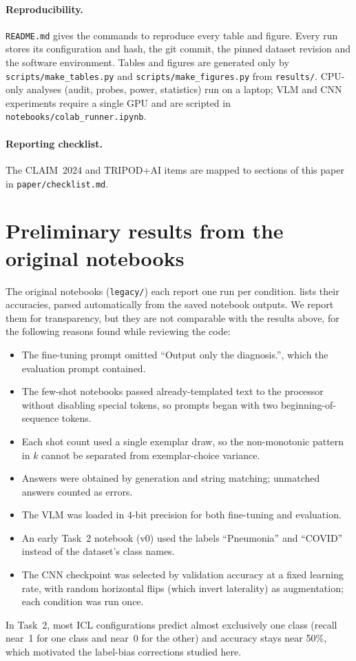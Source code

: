 \documentclass[11pt]{article}
\begin{document}
\paragraph{Reproducibility.} \texttt{README.md} gives the commands to reproduce every table and
figure. Every run stores its configuration and hash, the git commit, the pinned dataset
revision and the software environment. Tables and figures are generated only by
\texttt{scripts/make\_tables.py} and \texttt{scripts/make\_figures.py} from \texttt{results/}.
CPU-only analyses (audit, probes, power, statistics) run on a laptop; VLM and CNN experiments
require a single GPU and are scripted in \texttt{notebooks/colab\_runner.ipynb}.

\paragraph{Reporting checklist.} The CLAIM~2024 and TRIPOD+AI items are mapped to sections of
this paper in \texttt{paper/checklist.md}.




\appendix

\section{Preliminary results from the original notebooks}\label{sec:legacy}

The original notebooks (\texttt{legacy/}) each report one run per condition. 
lists their accuracies, parsed automatically from the saved notebook outputs. We report them for
transparency, but they are not comparable with the results above, for the following reasons
found while reviewing the code:
\begin{itemize}
  \item The fine-tuning prompt omitted ``Output only the diagnosis.'', which the evaluation
  prompt contained.
  \item The few-shot notebooks passed already-templated text to the processor without disabling
  special tokens, so prompts began with two beginning-of-sequence tokens.
  \item Each shot count used a single exemplar draw, so the non-monotonic pattern in $k$ cannot
  be separated from exemplar-choice variance.
  \item Answers were obtained by generation and string matching; unmatched answers counted as
  errors.
  \item The VLM was loaded in 4-bit precision for both fine-tuning and evaluation.
  \item An early Task~2 notebook (v0) used the labels ``Pneumonia'' and ``COVID'' instead of the
  dataset's class names.
  \item The CNN checkpoint was selected by validation accuracy at a fixed learning rate, with
  random horizontal flips (which invert laterality) as augmentation; each condition was run
  once.
\end{itemize}
In Task~2, most ICL configurations predict almost exclusively one class (recall near~1 for one
class and near~0 for the other) and accuracy stays near 50\%, which motivated the label-bias corrections studied
here.


\end{document}
